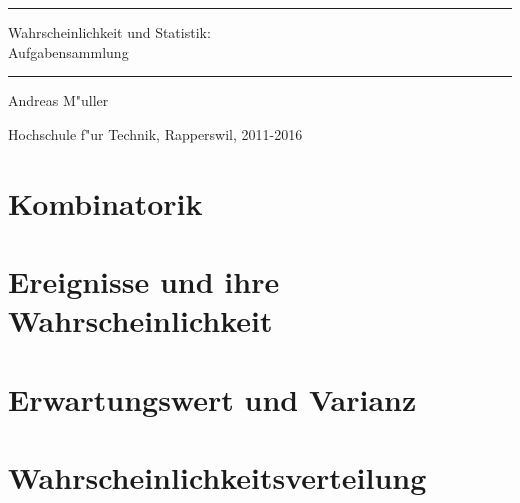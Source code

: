 \documentclass[a4paper,12pt]{book}
\begin{document}
\pagestyle{fancy}
\rhead{}
\frontmatter
\newcommand\HRule{\noindent\rule{\linewidth}{1.5pt}}
\begin{titlepage}
\HRule
\vspace*{2pt}
\begin{flushright}
{\Huge
Wahrscheinlichkeit und Statistik:\\
\bigskip
Aufgabensammlung}
\end{flushright}
\HRule
\begin{flushright}
\vspace{30pt}
\LARGE
Andreas M"uller
\end{flushright}
\begin{center}
Hochschule f"ur Technik, Rapperswil, 2011-2016
\end{center}
\end{titlepage}
\hypersetup{
        linktoc=all,
        linkcolor=blue
}
\tableofcontents
\newenvironment{beispiel}[1][Beispiel]{%
\begin{proof}[#1]%
\renewcommand{\qedsymbol}{$\bigcirc$}
}{\end{proof}}
\mainmatter


\chapter{Kombinatorik}

\chapter{Ereignisse und ihre Wahrscheinlichkeit}

%
\chapter{Erwartungswert und Varianz}

\chapter{Wahrscheinlichkeitsverteilung}

\end{document}
